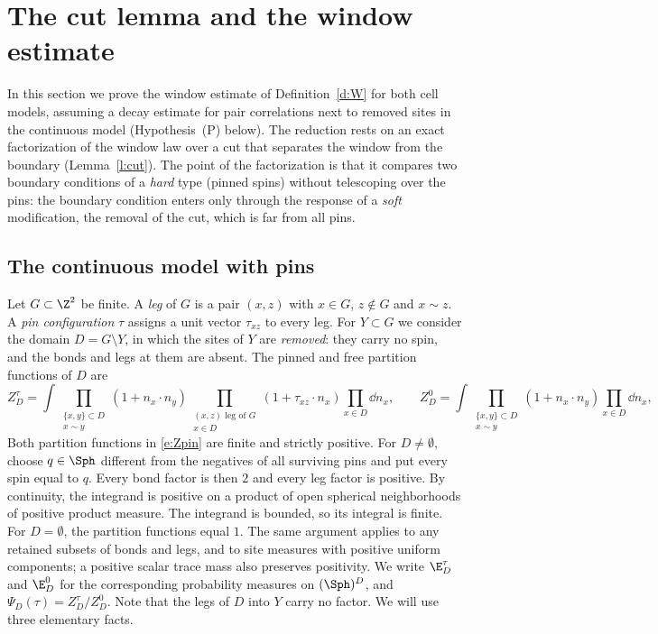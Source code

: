 \section{The cut lemma and the window estimate}\label{s:cut}

In this section we prove the window estimate of Definition~\ref{d:W} for both cell models, assuming a decay estimate for pair correlations next to removed sites in the continuous model (Hypothesis~(P) below). The reduction rests on an exact factorization of the window law over a cut that separates the window from the boundary (Lemma~\ref{l:cut}). The point of the factorization is that it compares two boundary conditions of a \emph{hard} type (pinned spins) without telescoping over the pins: the boundary condition enters only through the response of a \emph{soft} modification, the removal of the cut, which is far from all pins.

\subsection{The continuous model with pins}\label{s:contmodel}

Let $G \subset \Z^2$ be finite. A \emph{leg} of $G$ is a pair $(x, z)$ with $x \in G$, $z \notin G$ and $x \sim z$. A \emph{pin configuration} $\tau$ assigns a unit vector $\tau_{xz}$ to every leg. For $Y \subset G$ we consider the domain $D = G \setminus Y$, in which the sites of $Y$ are \emph{removed}: they carry no spin, and the bonds and legs at them are absent. The pinned and free partition functions of $D$ are
\begin{equation}\label{e:Zpin}
Z^\tau_D = \int \prod_{\substack{\{x, y\} \subset D \\ x \sim y}} (1 + n_x \cdot n_y) \prod_{\substack{(x, z) \text{ leg of } G \\ x \in D}} (1 + \tau_{xz} \cdot n_x) \prod_{x \in D} \dd n_x, \qquad Z^0_D = \int \prod_{\substack{\{x, y\} \subset D \\ x \sim y}} (1 + n_x \cdot n_y) \prod_{x \in D} \dd n_x ,
\end{equation}
Both partition functions in \eqref{e:Zpin} are finite and strictly positive. For $D\ne\emptyset$, choose $q\in\Sph$ different from the negatives of all surviving pins and put every spin equal to $q$. Every bond factor is then $2$ and every leg factor is positive. By continuity, the integrand is positive on a product of open spherical neighborhoods of positive product measure. The integrand is bounded, so its integral is finite. For $D=\emptyset$, the partition functions equal $1$. The same argument applies to any retained subsets of bonds and legs, and to site measures with positive uniform components; a positive scalar trace mass also preserves positivity. We write $\E^\tau_D$ and $\E^0_D$ for the corresponding probability measures on $(\Sph)^D$, and $\Psi_D(\tau) = Z^\tau_D / Z^0_D$. Note that the legs of $D$ into $Y$ carry no factor. We will use three elementary facts.

